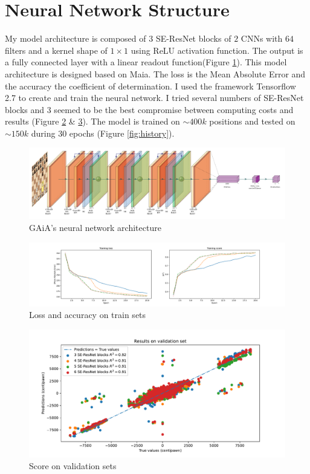 \documentclass[a4paper]{article}
\begin{document}
\section{Neural Network Structure}
My model architecture is composed of $3$ SE-ResNet blocks of $2$ CNNs with $64$ filters
and a kernel shape of $1\times1$ using ReLU activation function. The output is a
fully connected layer with a linear readout function(Figure \ref{fig:model_archi}).
This model architecture is designed based on Maia\cite{maia}.
The loss is the Mean Absolute Error and the accuracy the coefficient of determination.
I used the framework Tensorflow 2.7 to create and train the neural network.
I tried several numbers of SE-ResNet blocks and $3$ seemed
to be the best compromise between computing costs and results
(Figure \ref{fig:acc_loss} \& \ref{fig:score_valid}).
The model is trained on $\sim 400k$ positions and tested on $\sim 150k$ during 30 epochs (Figure \ref{fig:history}).

\begin{figure}[htp]
  \centering
  \includegraphics[width=13cm]{network/network.pdf}
  \caption{GAiA's neural network architecture}
  \label{fig:model_archi}
\end{figure}

\begin{figure}[!]
  \centering
  \includegraphics[width=15cm]{model_selection_1.pdf}
  \caption{Loss and accuracy on train sets}
  \label{fig:acc_loss}
\end{figure}

\begin{figure}[!]
  \centering
  \includegraphics[width=13cm]{model_selection_2.pdf}
  \caption{Score on validation sets}
  \label{fig:score_valid}
\end{figure}
\end{document}

